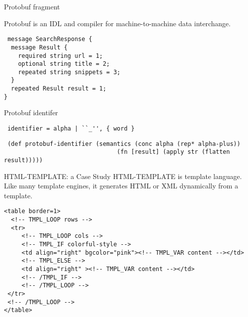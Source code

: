 \documentclass[presentation]{beamer}
\begin{document}
\begin{frame}[fragile]{Protobuf fragment}

  Protobuf is an IDL and compiler for machine-to-machine data
  interchange.

\begin{verbatim}
 message SearchResponse {
  message Result {
    required string url = 1;
    optional string title = 2;
    repeated string snippets = 3;
  }
  repeated Result result = 1;
}
\end{verbatim}
\end{frame}

\begin{frame}[fragile]{Protobuf identifer}

\begin{verbatim}
 identifier = alpha | ``_'', { word }
\end{verbatim}

\begin{verbatim}
 (def protobuf-identifier (semantics (conc alpha (rep* alpha-plus))
                                (fn [result] (apply str (flatten result)))))
\end{verbatim}

\end{frame}

\begin{frame}[fragile]{HTML-TEMPLATE: a Case Study}
HTML-TEMPLATE is template language. Like many template engines, it
generates HTML or XML dynamically from a template.

\begin{verbatim}
<table border=1>
  <!-- TMPL_LOOP rows -->
  <tr>
     <!-- TMPL_LOOP cols -->
     <!-- TMPL_IF colorful-style -->
     <td align="right" bgcolor="pink"><!-- TMPL_VAR content --></td>
     <!-- TMPL_ELSE -->
     <td align="right" ><!-- TMPL_VAR content --></td>
     <!-- /TMPL_IF -->
     <!-- /TMPL_LOOP -->
 </tr>
 <!-- /TMPL_LOOP -->
</table>
\end{verbatim}

\end{frame}
\end{document}
